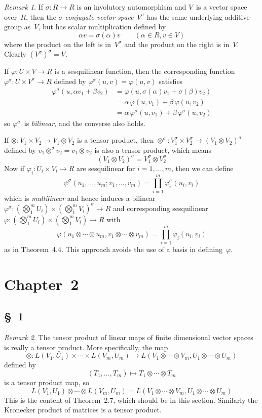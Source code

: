 \documentclass[letterpaper,12pt]{article}
\newcommand{\tprod}{\otimes}
\newcommand{\bigtprod}{\bigotimes}
\newcommand{\medtprod}{{\textstyle\bigtprod}}
\newcommand{\multi}[4]{#2_{#3}#1\cdots#1#2_{#4}}
\newcommand{\tprods}[3]{\multi{\tprod}{#1}{#2}{#3}}
\theoremstyle{definition}
\theoremstyle{remark}
\newtheorem*{rmk}{Remark}
\begin{document}
\begin{rmk}
If \(\sigma:R\to R\) is an involutory automorphism and \(V\)~is a vector space over~\(R\), then the \emph{\(\sigma\)-conjugate vector space}~\(V^{\sigma}\) has the same underlying additive group as~\(V\), but has scalar multiplication defined by
\[\alpha v=\sigma(\alpha)v\qquad(\alpha\in R,v\in V)\]
where the product on the left is in~\(V^{\sigma}\) and the product on the right is in~\(V\). Clearly \((V^{\sigma})^{\sigma}=V\).

If \(\varphi:U\times V\to R\) is a sesquilinear function, then the corresponding function \(\varphi^{\sigma}:U\times V^{\sigma}\to R\) defined by \(\varphi^{\sigma}(u,v)=\varphi(u,v)\) satisfies
\begin{align*}
\varphi^{\sigma}(u,\alpha v_1+\beta v_2)&=\varphi(u,\sigma(\alpha)v_1+\sigma(\beta)v_2)\\
	&=\alpha\,\varphi(u,v_1)+\beta\,\varphi(u,v_2)\\
	&=\alpha\,\varphi^{\sigma}(u,v_1)+\beta\,\varphi^{\sigma}(u,v_2)
\end{align*}
so \(\varphi^{\sigma}\)~is \emph{bilinear}, and the converse also holds.

If \(\tprod:V_1\times V_2\to V_1\tprod V_2\) is a tensor product, then \(\tprod^{\sigma}:V_1^{\sigma}\times V_2^{\sigma}\to(V_1\tprod V_2)^{\sigma}\) defined by \(v_1\tprod^{\sigma}v_2=v_1\tprod v_2\) is also a tensor product, which means
\[(V_1\tprod V_2)^{\sigma}=V_1^{\sigma}\tprod V_2^{\sigma}\]
Now if \(\varphi_i:U_i\times V_i\to R\) are sesquilinear for \(i=1,\ldots,m\), then we can define
\[\psi^{\sigma}(u_1,\ldots,u_m;v_1,\ldots,v_m)=\prod_{i=1}^m\varphi_i^{\sigma}(u_i,v_i)\]
which is \emph{multilinear} and hence induces a bilinear \(\varphi^{\sigma}:(\medtprod_1^m U_i)\times(\medtprod_1^m V_i)^{\sigma}\to R\) and corresponding sesquilinear \(\varphi:(\medtprod_1^m U_i)\times(\medtprod_1^m V_i)\to R\) with
\[\varphi(\tprods{u}{1}{m},\tprods{v}{1}{m})=\prod_{i=1}^m\varphi_i(u_i,v_i)\]
as in Theorem~4.4. This approach avoids the use of a basis in defining~\(\varphi\).
\end{rmk}

\newpage
\section*{Chapter~2}
\subsection*{\S~1}
\begin{rmk}
The tensor product of linear maps of finite dimensional vector spaces is really a tensor product. More specifically, the map
\[\tprod:L(V_1,U_1)\times\cdots\times L(V_m,U_m)\to L(\tprods{V}{1}{m},\tprods{U}{1}{m})\]
defined by
\[(T_1,\ldots,T_m)\mapsto\tprods{T}{1}{m}\]
is a tensor product map, so
\[L(V_1,U_1)\tprod\cdots\tprod L(V_m,U_m)=L(\tprods{V}{1}{m},\tprods{U}{1}{m})\]
This is the content of Theorem~2.7, which should be in this section. Similarly the Kronecker product of matrices is a tensor product.
\end{rmk}
\end{document}
